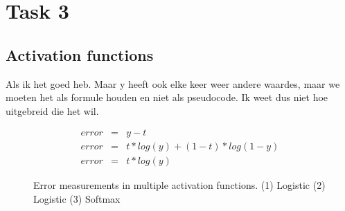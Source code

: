 \documentclass{article}
\begin{document}
\pagestyle{empty}

\def\layersep{3.5cm}

\section{Task 3}

\subsection{Activation functions}

Als ik het goed heb. Maar y heeft ook elke keer weer andere waardes, maar we moeten het als formule houden en niet als pseudocode. Ik weet dus niet hoe uitgebreid die het wil. 

\begin{figure}[!h]
	\centering
	\begin{eqnarray}
		error & = & y - t \\
		error & = & t * log(y) + (1 - t) * log(1 - y) \\
		error & = & t * log(y)
	\end{eqnarray}
	\caption{Error measurements in multiple activation functions. (1) Logistic (2) Logistic (3) Softmax }
\end{figure}
\end{document}

